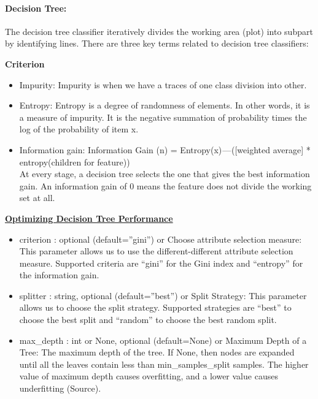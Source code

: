 \documentclass[11pt]{article}
\begin{document}
\paragraph*{Decision Tree:}
The decision tree classifier iteratively divides the working area (plot) into subpart by identifying lines.
There are three key terms related to decision tree classifiers:

\noindent \textbf{Criterion}
\begin{itemize}
\item Impurity:  
Impurity is when we have a traces of one class division into other.
\item Entropy:  
Entropy is a degree of randomness of elements. In other words, it is a measure of impurity. It is the negative summation of probability times the log of the probability of item x.
\item Information gain:  
Information Gain (n) = Entropy(x) — ([weighted average] * entropy(children for feature)) \\
At every stage, a decision tree selects the one that gives the best information gain. An information gain of 0 means the feature does not divide the working set at all.
\end{itemize}

%
\textbf{\href{https://www.datacamp.com/community/tutorials/decision-tree-classification-python}{Optimizing Decision Tree Performance}}
\begin{itemize}
\item criterion : optional (default=”gini”) or Choose attribute selection measure: This parameter allows us to use the different-different attribute selection measure. Supported criteria are “gini” for the Gini index and “entropy” for the information gain.
\item splitter : string, optional (default=”best”) or Split Strategy: This parameter allows us to choose the split strategy. Supported strategies are “best” to choose the best split and “random” to choose the best random split.
\item max\_depth : int or None, optional (default=None) or Maximum Depth of a Tree: The maximum depth of the tree. If None, then nodes are expanded until all the leaves contain less than min\_samples\_split samples. The higher value of maximum depth causes overfitting, and a lower value causes underfitting (Source).
\end{itemize}
%
\end{document}
